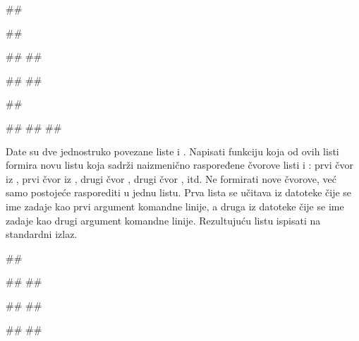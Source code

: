 \begin{Exercise}[label=605]
\begin{miditest}
\begin{test}{3}
##

##

##
##

#\naslovIzlaz#
#\izlaz{[5, 6, 11, 12, 14, 16]}#
\end{test}
\end{miditest}
\begin{miditest}
\begin{test}{4}
##

#\naslovIzlaz# 
## 
##
\end{test}
\end{miditest}

\end{Exercise}
\begin{Answer}[ref=605]
\end{Answer}

\begin{Exercise}[label=606]
Date su dve jednostruko povezane liste  i . Napisati funkciju koja od 
ovih listi formira novu listu  koja sadrži naizmenično raspoređene čvorove 
listi  i : prvi čvor iz , prvi čvor iz , drugi čvor ,
drugi čvor , itd. Ne formirati nove čvorove, već samo postojeće rasporediti u jednu listu. Prva lista se učitava iz datoteke čije se ime zadaje kao prvi argument komandne linije, a druga iz datoteke čije se ime zadaje kao 
drugi argument komandne linije. Rezultujuću listu ispisati na standardni izlaz. 


\begin{miditest}
\begin{test}{1}
##

##
##

##
##

#\naslovIzlaz#
##
\end{test}
\end{miditest}
\end{Exercise}

